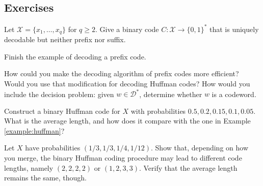 \subsection{Exercises}

\begin{exercise} \label{exercise:not_prefix}
Let $\mathcal{X} = \{x_1, \dots, x_q\}$ for $q \ge 2$. Give a binary code $C : \mathcal{X} \to \{0,1\}^*$ that is uniquely decodable but neither prefix nor suffix.
\end{exercise}

\begin{exercise} \label{exercise:prefix}
Finish the example of decoding a prefix code.
\end{exercise}

\begin{exercise} \label{exercise:decoding_prefix}
How could you make the decoding algorithm of prefix codes more efficient? Would you use that modification for decoding Huffman codes? How would you include the decision problem: given $w \in \mathcal{D}^*$, determine whether $w$ is a codeword.
\end{exercise}

\begin{exercise} \label{exercise:huffman}
Construct a binary Huffman code for $X$ with probabilities $0.5, 0.2, 0.15, 0.1, 0.05$. What is the average length, and how does it compare with the one in Example \ref{example:huffman}?
\end{exercise}

\begin{exercise} \label{exercise:huffman_unequal_lengths}
Let $X$ have probabilities $(1/3, 1/3, 1/4, 1/{12})$. Show that, depending on how you merge, the binary Huffman coding procedure may lead to different code lengths, namely $(2,2,2,2)$ or $(1,2,3,3)$. Verify that the average length remains the same, though.
\end{exercise}



